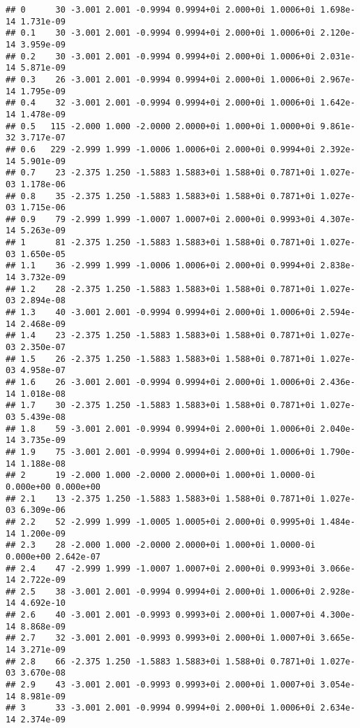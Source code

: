 \documentclass[
  12pt,
]{article}
\begin{document}
\begin{verbatim}
## 0      30 -3.001 2.001 -0.9994 0.9994+0i 2.000+0i 1.0006+0i 1.698e-14 1.731e-09
## 0.1    30 -3.001 2.001 -0.9994 0.9994+0i 2.000+0i 1.0006+0i 2.120e-14 3.959e-09
## 0.2    30 -3.001 2.001 -0.9994 0.9994+0i 2.000+0i 1.0006+0i 2.031e-14 5.871e-09
## 0.3    26 -3.001 2.001 -0.9994 0.9994+0i 2.000+0i 1.0006+0i 2.967e-14 1.795e-09
## 0.4    32 -3.001 2.001 -0.9994 0.9994+0i 2.000+0i 1.0006+0i 1.642e-14 1.478e-09
## 0.5   115 -2.000 1.000 -2.0000 2.0000+0i 1.000+0i 1.0000+0i 9.861e-32 3.717e-07
## 0.6   229 -2.999 1.999 -1.0006 1.0006+0i 2.000+0i 0.9994+0i 2.392e-14 5.901e-09
## 0.7    23 -2.375 1.250 -1.5883 1.5883+0i 1.588+0i 0.7871+0i 1.027e-03 1.178e-06
## 0.8    35 -2.375 1.250 -1.5883 1.5883+0i 1.588+0i 0.7871+0i 1.027e-03 1.715e-06
## 0.9    79 -2.999 1.999 -1.0007 1.0007+0i 2.000+0i 0.9993+0i 4.307e-14 5.263e-09
## 1      81 -2.375 1.250 -1.5883 1.5883+0i 1.588+0i 0.7871+0i 1.027e-03 1.650e-05
## 1.1    36 -2.999 1.999 -1.0006 1.0006+0i 2.000+0i 0.9994+0i 2.838e-14 3.732e-09
## 1.2    28 -2.375 1.250 -1.5883 1.5883+0i 1.588+0i 0.7871+0i 1.027e-03 2.894e-08
## 1.3    40 -3.001 2.001 -0.9994 0.9994+0i 2.000+0i 1.0006+0i 2.594e-14 2.468e-09
## 1.4    23 -2.375 1.250 -1.5883 1.5883+0i 1.588+0i 0.7871+0i 1.027e-03 2.350e-07
## 1.5    26 -2.375 1.250 -1.5883 1.5883+0i 1.588+0i 0.7871+0i 1.027e-03 4.958e-07
## 1.6    26 -3.001 2.001 -0.9994 0.9994+0i 2.000+0i 1.0006+0i 2.436e-14 1.018e-08
## 1.7    30 -2.375 1.250 -1.5883 1.5883+0i 1.588+0i 0.7871+0i 1.027e-03 5.439e-08
## 1.8    59 -3.001 2.001 -0.9994 0.9994+0i 2.000+0i 1.0006+0i 2.040e-14 3.735e-09
## 1.9    75 -3.001 2.001 -0.9994 0.9994+0i 2.000+0i 1.0006+0i 1.790e-14 1.188e-08
## 2      19 -2.000 1.000 -2.0000 2.0000+0i 1.000+0i 1.0000-0i 0.000e+00 0.000e+00
## 2.1    13 -2.375 1.250 -1.5883 1.5883+0i 1.588+0i 0.7871+0i 1.027e-03 6.309e-06
## 2.2    52 -2.999 1.999 -1.0005 1.0005+0i 2.000+0i 0.9995+0i 1.484e-14 1.200e-09
## 2.3    28 -2.000 1.000 -2.0000 2.0000+0i 1.000+0i 1.0000-0i 0.000e+00 2.642e-07
## 2.4    47 -2.999 1.999 -1.0007 1.0007+0i 2.000+0i 0.9993+0i 3.066e-14 2.722e-09
## 2.5    38 -3.001 2.001 -0.9994 0.9994+0i 2.000+0i 1.0006+0i 2.928e-14 4.692e-10
## 2.6    40 -3.001 2.001 -0.9993 0.9993+0i 2.000+0i 1.0007+0i 4.300e-14 8.868e-09
## 2.7    32 -3.001 2.001 -0.9993 0.9993+0i 2.000+0i 1.0007+0i 3.665e-14 3.271e-09
## 2.8    66 -2.375 1.250 -1.5883 1.5883+0i 1.588+0i 0.7871+0i 1.027e-03 3.670e-08
## 2.9    43 -3.001 2.001 -0.9993 0.9993+0i 2.000+0i 1.0007+0i 3.054e-14 8.981e-09
## 3      33 -3.001 2.001 -0.9994 0.9994+0i 2.000+0i 1.0006+0i 2.634e-14 2.374e-09
\end{verbatim}
\end{document}
